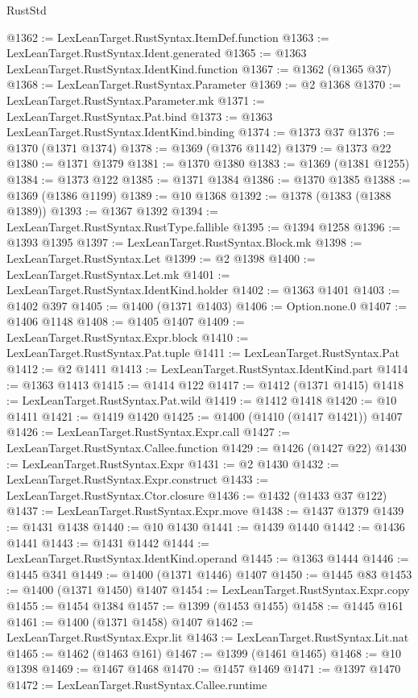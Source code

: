 \begin{lexlean}{RustStd}
\begin{coremodule}
@1362 := LexLeanTarget.RustSyntax.ItemDef.function
@1363 := LexLeanTarget.RustSyntax.Ident.generated
@1365 := @1363 LexLeanTarget.RustSyntax.IdentKind.function
@1367 := @1362 (@1365 @37)
@1368 := LexLeanTarget.RustSyntax.Parameter
@1369 := @2 @1368
@1370 := LexLeanTarget.RustSyntax.Parameter.mk
@1371 := LexLeanTarget.RustSyntax.Pat.bind
@1373 := @1363 LexLeanTarget.RustSyntax.IdentKind.binding
@1374 := @1373 @37
@1376 := @1370 (@1371 @1374)
@1378 := @1369 (@1376 @1142)
@1379 := @1373 @22
@1380 := @1371 @1379
@1381 := @1370 @1380
@1383 := @1369 (@1381 @1255)
@1384 := @1373 @122
@1385 := @1371 @1384
@1386 := @1370 @1385
@1388 := @1369 (@1386 @1199)
@1389 := @10 @1368
@1392 := @1378 (@1383 (@1388 @1389))
@1393 := @1367 @1392
@1394 := LexLeanTarget.RustSyntax.RustType.fallible
@1395 := @1394 @1258
@1396 := @1393 @1395
@1397 := LexLeanTarget.RustSyntax.Block.mk
@1398 := LexLeanTarget.RustSyntax.Let
@1399 := @2 @1398
@1400 := LexLeanTarget.RustSyntax.Let.mk
@1401 := LexLeanTarget.RustSyntax.IdentKind.holder
@1402 := @1363 @1401
@1403 := @1402 @397
@1405 := @1400 (@1371 @1403)
@1406 := Option.none.{0}
@1407 := @1406 @1148
@1408 := @1405 @1407
@1409 := LexLeanTarget.RustSyntax.Expr.block
@1410 := LexLeanTarget.RustSyntax.Pat.tuple
@1411 := LexLeanTarget.RustSyntax.Pat
@1412 := @2 @1411
@1413 := LexLeanTarget.RustSyntax.IdentKind.part
@1414 := @1363 @1413
@1415 := @1414 @122
@1417 := @1412 (@1371 @1415)
@1418 := LexLeanTarget.RustSyntax.Pat.wild
@1419 := @1412 @1418
@1420 := @10 @1411
@1421 := @1419 @1420
@1425 := @1400 (@1410 (@1417 @1421)) @1407
@1426 := LexLeanTarget.RustSyntax.Expr.call
@1427 := LexLeanTarget.RustSyntax.Callee.function
@1429 := @1426 (@1427 @22)
@1430 := LexLeanTarget.RustSyntax.Expr
@1431 := @2 @1430
@1432 := LexLeanTarget.RustSyntax.Expr.construct
@1433 := LexLeanTarget.RustSyntax.Ctor.closure
@1436 := @1432 (@1433 @37 @122)
@1437 := LexLeanTarget.RustSyntax.Expr.move
@1438 := @1437 @1379
@1439 := @1431 @1438
@1440 := @10 @1430
@1441 := @1439 @1440
@1442 := @1436 @1441
@1443 := @1431 @1442
@1444 := LexLeanTarget.RustSyntax.IdentKind.operand
@1445 := @1363 @1444
@1446 := @1445 @341
@1449 := @1400 (@1371 @1446) @1407
@1450 := @1445 @83
@1453 := @1400 (@1371 @1450) @1407
@1454 := LexLeanTarget.RustSyntax.Expr.copy
@1455 := @1454 @1384
@1457 := @1399 (@1453 @1455)
@1458 := @1445 @161
@1461 := @1400 (@1371 @1458) @1407
@1462 := LexLeanTarget.RustSyntax.Expr.lit
@1463 := LexLeanTarget.RustSyntax.Lit.nat
@1465 := @1462 (@1463 @161)
@1467 := @1399 (@1461 @1465)
@1468 := @10 @1398
@1469 := @1467 @1468
@1470 := @1457 @1469
@1471 := @1397 @1470
@1472 := LexLeanTarget.RustSyntax.Callee.runtime

\end{coremodule}
\end{lexlean}
